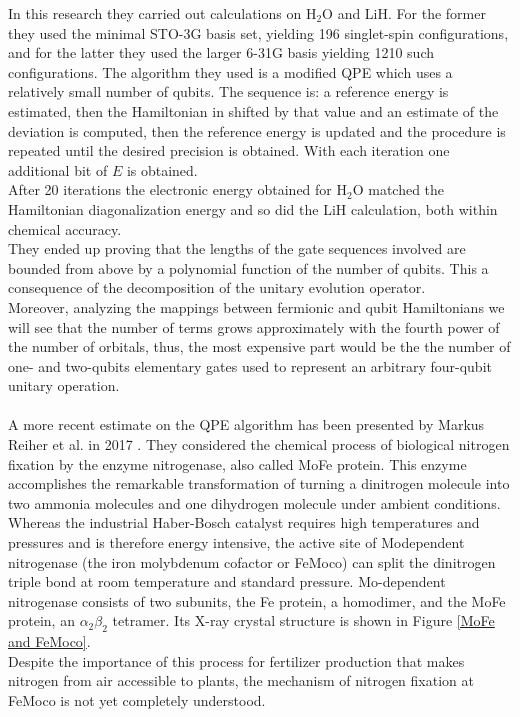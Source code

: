 In this research they carried out calculations on H$_2$O and LiH. For the former they used the minimal STO-3G basis set, yielding 196 singlet-spin configurations, and for the latter they used the larger 6-31G basis yielding 1210 such configurations. The algorithm they used is a modified QPE which uses a relatively small number of qubits. The sequence is: a reference energy is estimated, then the Hamiltonian in shifted by that value and an estimate of the deviation is computed, then the reference energy is updated and the procedure is repeated until the desired precision is obtained. With each iteration one additional bit of $E$ is obtained. \\
After 20 iterations the electronic energy obtained for H$_2$O matched the Hamiltonian diagonalization energy and so did the LiH calculation, both within chemical accuracy. \\
They ended up proving that the lengths of the gate sequences involved are bounded from above by a polynomial function of the number of qubits. This a consequence of the decomposition of the unitary evolution operator. \\
Moreover, analyzing the mappings between fermionic and qubit Hamiltonians we will see that the number of terms grows approximately with the fourth power of the number of orbitals, thus, the most expensive part would be the the number of one- and two-qubits elementary gates used to represent an arbitrary four-qubit unitary operation. \\
\\
A more recent estimate on the QPE algorithm has been presented by Markus Reiher et al. in 2017 \cite{Reiher2017Jul}. They considered the chemical process of biological nitrogen fixation by the enzyme nitrogenase, also called MoFe protein. This enzyme accomplishes the remarkable transformation of turning a dinitrogen molecule into two ammonia molecules and one dihydrogen molecule under ambient conditions. Whereas the industrial Haber-Bosch catalyst requires high temperatures and pressures and is therefore energy intensive, the active site of Modependent nitrogenase (the iron molybdenum cofactor or FeMoco) can split the dinitrogen triple bond at room temperature and standard pressure. Mo-dependent nitrogenase consists of two subunits, the Fe protein, a homodimer, and the MoFe protein, an $\alpha_2 \beta_2$ tetramer. Its X-ray crystal structure is shown in Figure \ref{MoFe and FeMoco}. \\
Despite the importance of this process for fertilizer production that makes nitrogen from air accessible to plants, the mechanism of nitrogen fixation at FeMoco is not yet completely understood. \\
